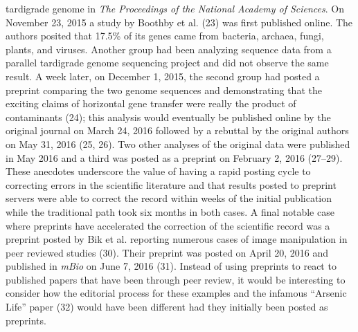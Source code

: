 \documentclass[11pt,]{article}
\begin{document}
tardigrade genome in \emph{The Proceedings of the National Academy of
Sciences}. On November 23, 2015 a study by Boothby et al. (23) was first
published online. The authors posited that 17.5\% of its genes came from
bacteria, archaea, fungi, plants, and viruses. Another group had been
analyzing sequence data from a parallel tardigrade genome sequencing
project and did not observe the same result. A week later, on December
1, 2015, the second group had posted a preprint comparing the two genome
sequences and demonstrating that the exciting claims of horizontal gene
transfer were really the product of contaminants (24); this analysis
would eventually be published online by the original journal on March
24, 2016 followed by a rebuttal by the original authors on May 31, 2016
(25, 26). Two other analyses of the original data were published in May
2016 and a third was posted as a preprint on February 2, 2016 (27--29).
These anecdotes underscore the value of having a rapid posting cycle to
correcting errors in the scientific literature and that results posted
to preprint servers were able to correct the record within weeks of the
initial publication while the traditional path took six months in both
cases. A final notable case where preprints have accelerated the
correction of the scientific record was a preprint posted by Bik et al.
reporting numerous cases of image manipulation in peer reviewed studies
(30). Their preprint was posted on April 20, 2016 and published in
\emph{mBio} on June 7, 2016 (31). Instead of using preprints to react to
published papers that have been through peer review, it would be
interesting to consider how the editorial process for these examples and
the infamous ``Arsenic Life'' paper (32) would have been different had
they initially been posted as preprints.
\end{document}
